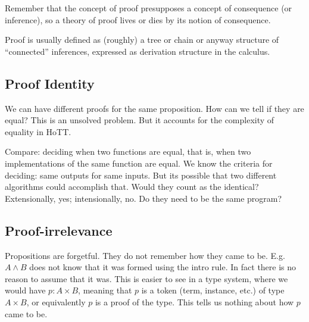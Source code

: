 \documentclass{article}
\begin{document}

Remember that the concept of proof presupposes a concept of
consequence (or inference), so a theory of proof lives or dies by its
notion of consequence.

Proof is usually defined as (roughly) a tree or chain or anyway
structure of ``connected'' inferences, expressed as derivation
structure in the calculus.

\subsection{Proof Identity}

We can have different proofs for the same proposition. How can we tell
if they are equal? This is an unsolved problem. But it accounts for
the complexity of equality in HoTT.

Compare: deciding when two functions are equal, that is, when two
implementations of the same function are equal. We know the criteria
for deciding: same outputs for same inputs. But its possible that two
different algorithms could accomplish that. Would they count as the
identical? Extensionally, yes; intensionally, no. Do they need to be
the same program?

\subsection{Proof-irrelevance}
Propositions are forgetful. They do not remember how they came to be.
E.g. \(A\land B\) does not know that it was formed using the intro
rule. In fact there is no reason to assume that it was. This is easier
to see in a type system, where we would have \(p:A\times B\), meaning
that \(p\) is a token (term, instance, etc.) of type \(A\times B\), or
equivalently \(p\) is a proof of the type. This tells us nothing about
how \(p\) came to be.
\end{document}

